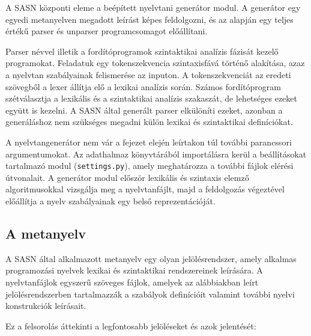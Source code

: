 \documentclass[twoside, 12pt]{report}
\begin{document}
A SASN központi eleme a beépített nyelvtani generátor modul. A generátor egy egyedi metanyelven megadott leírást képes feldolgozni, és az alapján egy teljes értékű parser és unparser programcsomagot előállítani.

Parser névvel illetik a fordítóprogramok szintaktikai analízis fázisát kezelő programokat. Feladatuk egy tokenszekvencia szintaxisfává történő alakítása, azaz a nyelvtan szabályainak felismerése az inputon. A tokenszekvenciát az eredeti szövegből a lexer állítja elő a lexikai analízis során. Számos fordítóprogram szétválasztja a lexikális és a szintaktikai analízis szakaszát, de lehetséges ezeket együtt is kezelni. A SASN által generált parser elkülöníti ezeket, azonban a generáláshoz nem szükséges megadni külön lexikai és szintaktikai definíciókat.

A nyelvtangenerátor nem vár a fejezet elején leírtakon túl további parancssori argumentumokat. Az adathalmaz könyvtárából importálásra kerül a beállításokat tartalmazó modul (\verb|settings.py|), amely meghatározza a további fájlok elérési útvonalait. A generátor modul először lexikális és szintaxis elemző algoritmusokkal vizsgálja meg a nyelvtanfájlt, majd a feldolgozás végeztével előállítja a nyelv szabályainak egy belső reprezentációját.

\subsection{A metanyelv}

A SASN által alkalmazott metanyelv egy olyan jelölésrendszer, amely alkalmas programozási nyelvek lexikai és szintaktikai rendszereinek leírására. A nyelvtanfájlok egyszerű szöveges fájlok, amelyek az alábbiakban leírt jelölésrendszerben tartalmazzák a szabályok definícióit valamint további nyelvi konstrukciók leírásait.

Ez a felsorolás áttekinti a legfontosabb jelöléseket és azok jelentését:
\end{document}

